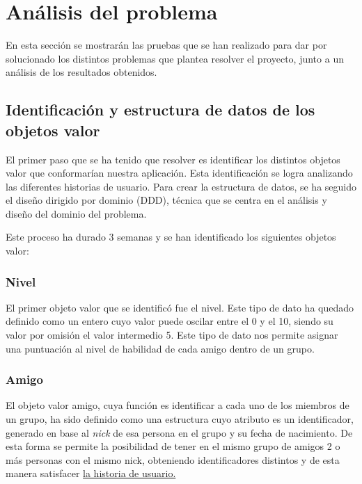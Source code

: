 \chapter{Análisis del problema}
 
En esta sección se mostrarán las pruebas que se han realizado para dar por solucionado los distintos problemas que plantea resolver 
el proyecto, junto a un análisis de los resultados obtenidos.

\section{Identificación y estructura de datos de los objetos valor}

El primer paso que se ha tenido que resolver es identificar los distintos objetos valor que conformarían nuestra aplicación. Esta identificación se logra analizando las diferentes historias de usuario.
Para crear la estructura de datos, se ha seguido el diseño dirigido por dominio (DDD), técnica que se centra en el análisis y diseño del dominio del problema.

Este proceso ha durado 3 semanas y se han identificado los siguientes objetos valor:

\subsection{Nivel}

El primer objeto valor que se identificó fue el nivel.
Este tipo de dato ha quedado definido como un entero cuyo valor puede oscilar entre el 0 y el 10, siendo su valor por omisión el valor intermedio 5.
Este tipo de dato nos permite asignar una puntuación al nivel de habilidad de cada amigo dentro de un grupo.

\subsection{Amigo}

El objeto valor amigo, cuya función es identificar a cada uno de los miembros de un grupo, ha sido definido como una estructura cuyo atributo es un identificador, generado en base al \textit{nick}
 de esa persona en el grupo y su fecha de nacimiento. De esta forma se permite la posibilidad de tener en el mismo grupo de amigos 2 o más personas con el mismo nick, obteniendo identificadores distintos
 y de esta manera satisfacer \href{https://github.com/manujurado1/SportsBar-IV/issues/119}{la historia de usuario.}


